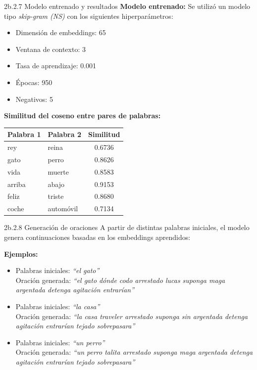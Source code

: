 \documentclass{beamer}
\begin{document}
\begin{frame}{2b.2.7 Modelo entrenado y resultados}
	\justifying
	\textbf{Modelo entrenado:} Se utilizó un modelo tipo \textit{skip-gram (NS)} con los siguientes hiperparámetros:
	\begin{itemize}
		\item Dimensión de embeddings: 65
		\item Ventana de contexto: 3
		\item Tasa de aprendizaje: 0.001
		\item Épocas: 950
		\item Negativos: 5
	\end{itemize}
	
	\vspace{0.3cm}
	\textbf{Similitud del coseno entre pares de palabras:}
	\begin{table}[]
		\centering
		\begin{tabular}{l l c}
			\hline
			Palabra 1 & Palabra 2 & Similitud \\
			\hline
			rey     & reina     & 0.6736 \\
			gato    & perro     & 0.8626 \\
			vida    & muerte    & 0.8583 \\
			arriba  & abajo     & 0.9153 \\
			feliz   & triste    & 0.8680 \\
			coche   & automóvil & 0.7134 \\
			\hline
		\end{tabular}
	\end{table}
	
\end{frame}


\begin{frame}{2b.2.8 Generación de oraciones}
	\justifying
	A partir de distintas palabras iniciales, el modelo genera continuaciones basadas en los embeddings aprendidos:
	
	\vspace{0.3cm}
	\textbf{Ejemplos:}
	\begin{itemize}
		\item Palabras iniciales: \textit{``el gato''} \\
		Oración generada: \textit{``el gato dónde codo arrestado lucas suponga maga argentada detenga agitación entrarían''}
		\item Palabras iniciales: \textit{``la casa''} \\
		Oración generada: \textit{``la casa traveler arrestado suponga sin argentada detenga agitación entrarían tejado sobrepasara''}
		\item Palabras iniciales: \textit{``un perro''} \\
		Oración generada: \textit{``un perro talita arrestado suponga maga argentada detenga agitación entrarían tejado sobrepasara''}
	\end{itemize}
\end{frame}
\end{document}
